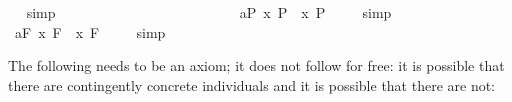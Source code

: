 \begin{isabellebody}
\isadelimproof
\ %
\endisadelimproof
%
\isatagproof
{}\isamarkupfalse%
\ simp\ \isamarkupfalse%
%
\endisatagproof
{\isafoldproof}%
%
\isadelimproof
%
\endisadelimproof
\ \ \ \ \ \ \ \ \ \ \ \ \ \ \ \ \ \ \ \ \ \ \ \isanewline
{}\isamarkupfalse%
\ a{}{}{\isacharunderscore}{}{\isacharunderscore}P{\isacharcolon}\ {\isachardoublequoteopen}{\isacharbrackleft}{\isacharparenleft}\isactrlbold {\isasymforall}x{\isachardot}\ \isactrlbold {\isasymbox}{\isacharparenleft}{\isasymphi}\isactrlsup P{\isacharparenright}{\isacharparenright}\ \isactrlbold {\isasymrightarrow}\ \isactrlbold {\isasymbox}{\isacharparenleft}{\isacharparenleft}\isactrlbold {\isasymforall}x{\isachardot}\ {\isacharparenleft}{\isasymphi}\isactrlsup P{\isacharparenright}{\isacharparenright}{\isacharparenright}{\isacharbrackright}\ {\isacharequal}\ {\isasymtop}{\isachardoublequoteclose}%
\isadelimproof
\ %
\endisadelimproof
%
\isatagproof
{}\isamarkupfalse%
\ simp\ \isamarkupfalse%
%
\endisatagproof
{\isafoldproof}%
%
\isadelimproof
%
\endisadelimproof
\ \ \ \ \ \ \ \ \ \isanewline
{}\isamarkupfalse%
\ a{}{}{\isacharunderscore}{}{\isacharunderscore}F{\isacharcolon}\ {\isachardoublequoteopen}{\isacharbrackleft}{\isacharparenleft}\isactrlbold {\isasymforall}x{\isachardot}\ \isactrlbold {\isasymbox}{\isacharparenleft}{\isasymphi}\isactrlsup F{\isacharparenright}{\isacharparenright}\ \isactrlbold {\isasymrightarrow}\ \isactrlbold {\isasymbox}{\isacharparenleft}{\isacharparenleft}\isactrlbold {\isasymforall}x{\isachardot}\ {\isacharparenleft}{\isasymphi}\isactrlsup F{\isacharparenright}{\isacharparenright}{\isacharparenright}{\isacharbrackright}\ {\isacharequal}\ {\isasymtop}{\isachardoublequoteclose}%
\isadelimproof
\ %
\endisadelimproof
%
\isatagproof
{}\isamarkupfalse%
\ simp\ \isamarkupfalse%
%
\endisatagproof
{\isafoldproof}%
%
\isadelimproof
%
\endisadelimproof
%
\begin{isamarkuptext}%
The following needs to be an axiom; it does not follow for free: it is possible that there 
are contingently concrete individuals and it is possible that there are not:%
\end{isamarkuptext}%
\isamarkuptrue%
\isamarkupfalse%
\ \isanewline

\end{isabellebody}
